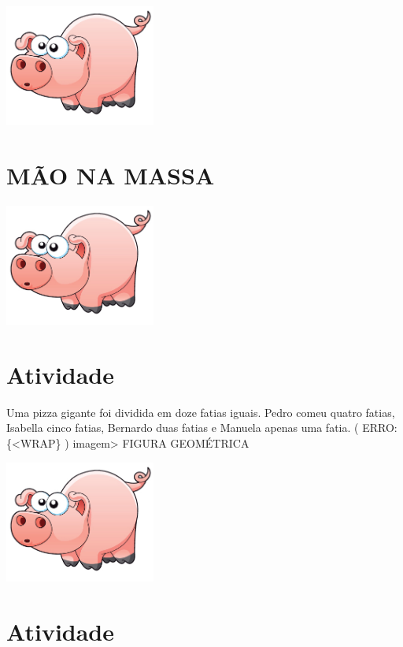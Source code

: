 \documentclass[a4,12pt]{book}
\begin{document}
\includegraphics[width=\textwidth,height=4cm, keepaspectratio]{pig}
\section*{ MÃO NA MASSA }





\includegraphics[width=\textwidth,height=4cm, keepaspectratio]{pig}
\section{Atividade}








Uma pizza gigante foi dividida em doze fatias iguais.
Pedro comeu quatro fatias, Isabella cinco fatias, Bernardo duas fatias e Manuela apenas uma fatia.
( ERRO:\{<WRAP\} ) imagem> FIGURA GEOMÉTRICA

\includegraphics[width=\textwidth,height=4cm, keepaspectratio]{pig}
\section{Atividade}
\end{document}
